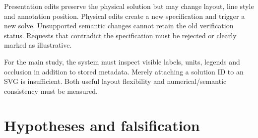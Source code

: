 \documentclass[
  11pt,
  a4paper,
]{article}
\begin{document}
Presentation edits preserve the physical solution but may change layout,
line style and annotation position. Physical edits create a new
specification and trigger a new solve. Unsupported semantic changes
cannot retain the old verification status. Requests that contradict the
specification must be rejected or clearly marked as illustrative.

For the main study, the system must inspect visible labels, units,
legends and occlusion in addition to stored metadata. Merely attaching a
solution ID to an SVG is insufficient. Both useful layout flexibility
and numerical/semantic consistency must be measured.

\section{Hypotheses and
falsification}\label{hypotheses-and-falsification}
\end{document}

